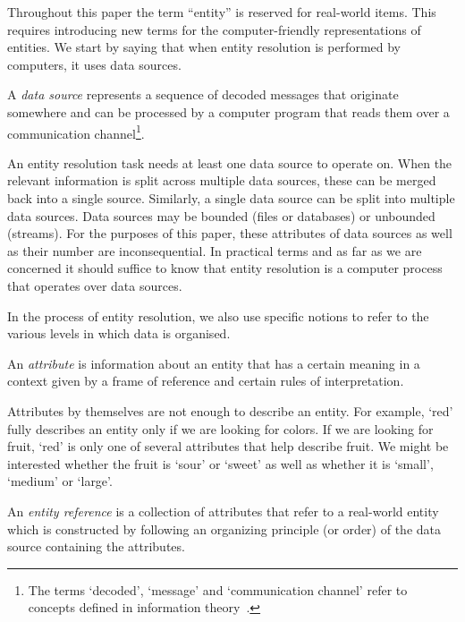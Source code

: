 Throughout this paper the term ``entity'' is reserved for real-world items.
This requires introducing new terms for the computer-friendly representations of
entities.
We start by saying that when entity resolution is performed by computers, it
uses data sources.

\begin{defn}
    A \textit{data source} represents a sequence of decoded messages
    that originate somewhere and can be processed by a computer program that
    reads them over a communication channel\footnote{The terms `decoded', `message' and `communication channel' refer to concepts
    defined in information theory~\cite{ash2012it}.}.
\end{defn}



An entity resolution task needs at least one data source to operate on.
When the relevant information is split across multiple data sources, these
can be merged back into a single source.
Similarly, a single data source can be split into multiple data sources.
Data sources may be bounded (files or databases) or unbounded (streams).
For the purposes of this paper, these attributes of data sources as well as
their number are inconsequential.
In practical terms and as far as we are concerned it should suffice to know that
entity resolution is a computer process that operates over data sources.

In the process of entity resolution, we also use specific notions to refer to
the various levels in which data is organised.

\begin{defn}
    An \textit{attribute} is information about an entity that has a certain
    meaning in a context given by a frame of reference and certain rules of
    interpretation.
\end{defn}

Attributes by themselves are not enough to describe an entity.
For example, `red' fully describes an entity only if we are looking for
colors.
If we are looking for fruit, `red' is only one of several attributes that
help describe fruit.
We might be interested whether the fruit is `sour' or `sweet' as well as
whether it is `small', `medium' or `large'.

\begin{defn}
    An \textit{entity reference} is a collection of attributes that refer
    to a real-world entity which is constructed by following an organizing
    principle (or order) of the data source containing the attributes.
\end{defn}

